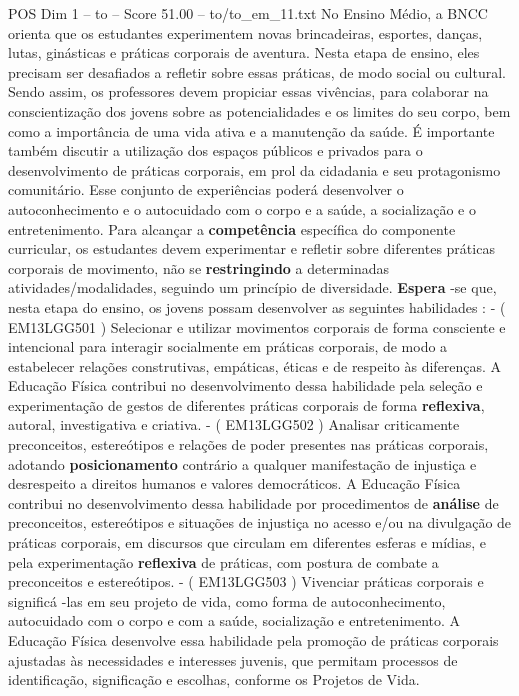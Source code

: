 \begin{textsample}{POS Dim 1 – to – Score 51.00 – to/to\_em\_11.txt}
No Ensino Médio, a BNCC orienta que os estudantes experimentem novas brincadeiras, esportes, danças, lutas, ginásticas e práticas corporais de aventura.
Nesta etapa de ensino, eles precisam ser desafiados a refletir sobre essas práticas, de modo social ou cultural.
Sendo assim, os professores devem propiciar essas vivências, para colaborar na conscientização dos jovens sobre as potencialidades e os limites do seu corpo, bem como a importância de uma vida ativa e a manutenção da saúde.
É importante também discutir a utilização dos espaços públicos e privados para o desenvolvimento de práticas corporais, em prol da cidadania e seu protagonismo comunitário.
Esse conjunto de experiências poderá desenvolver o autoconhecimento e o autocuidado com o corpo e a saúde, a socialização e o entretenimento.
Para alcançar a \textbf{competência} específica do componente curricular, os estudantes devem experimentar e refletir sobre diferentes práticas corporais de movimento, não se \textbf{restringindo} a determinadas atividades/modalidades, seguindo um princípio de diversidade. \textbf{Espera} -se que, nesta etapa do ensino, os jovens possam desenvolver as seguintes habilidades : - ( EM13LGG501 ) Selecionar e utilizar movimentos corporais de forma consciente e intencional para interagir socialmente em práticas corporais, de modo a estabelecer relações construtivas, empáticas, éticas e de respeito às diferenças.
A Educação Física contribui no desenvolvimento dessa habilidade pela seleção e experimentação de gestos de diferentes práticas corporais de forma \textbf{reflexiva}, autoral, investigativa e criativa. - ( EM13LGG502 ) Analisar criticamente preconceitos, estereótipos e relações de poder presentes nas práticas corporais, adotando \textbf{posicionamento} contrário a qualquer manifestação de injustiça e desrespeito a direitos humanos e valores democráticos.
A Educação Física contribui no desenvolvimento dessa habilidade por procedimentos de \textbf{análise} de preconceitos, estereótipos e situações de injustiça no acesso e/ou na divulgação de práticas corporais, em discursos que circulam em diferentes esferas e mídias, e pela experimentação \textbf{reflexiva} de práticas, com postura de combate a preconceitos e estereótipos. - ( EM13LGG503 ) Vivenciar práticas corporais e significá -las em seu projeto de vida, como forma de autoconhecimento, autocuidado com o corpo e com a saúde, socialização e entretenimento.
A Educação Física desenvolve essa habilidade pela promoção de práticas corporais ajustadas às necessidades e interesses juvenis, que permitam processos de identificação, significação e escolhas, conforme os Projetos de Vida.

\end{textsample}
